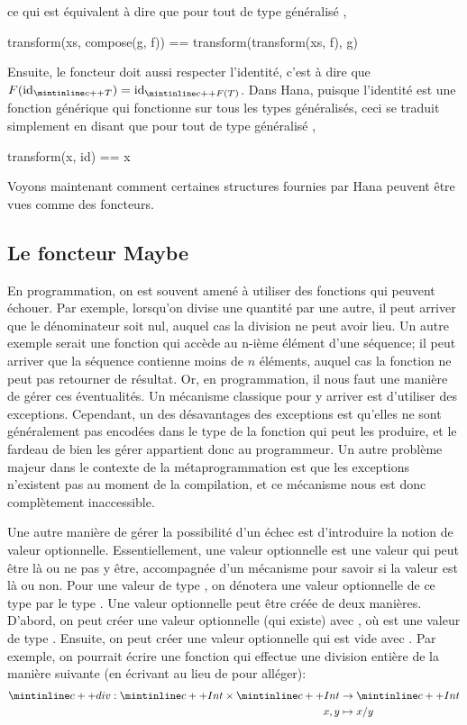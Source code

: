 ce qui est équivalent à dire que pour tout  de type généralisé ,
\begin{cpp}
    transform(xs, compose(g, f)) == transform(transform(xs, f), g)
\end{cpp}

Ensuite, le foncteur doit aussi respecter l'identité, c'est à dire que
$F(\id_{\cc{T}}) = \id_{\cc{F(T)}}$. Dans Hana, puisque l'identité est une
fonction générique qui fonctionne sur tous les types généralisés, ceci se
traduit simplement en disant que pour tout  de type généralisé ,
\begin{cpp}
    transform(x, id) == x
\end{cpp}

Voyons maintenant comment certaines structures fournies par Hana peuvent
être vues comme des foncteurs.


\subsection{Le foncteur Maybe}
En programmation, on est souvent amené à utiliser des fonctions qui peuvent
échouer. Par exemple, lorsqu'on divise une quantité par une autre, il peut
arriver que le dénominateur soit nul, auquel cas la division ne peut avoir
lieu. Un autre exemple serait une fonction qui accède au n-ième élément
d'une séquence; il peut arriver que la séquence contienne moins de $n$
éléments, auquel cas la fonction ne peut pas retourner de résultat. Or,
en programmation, il nous faut une manière de gérer ces éventualités. Un
mécanisme classique pour y arriver est d'utiliser des exceptions. Cependant,
un des désavantages des exceptions est qu'elles ne sont généralement pas
encodées dans le type de la fonction qui peut les produire, et le fardeau
de bien les gérer appartient donc au programmeur. Un autre problème majeur
dans le contexte de la métaprogrammation est que les exceptions n'existent
pas au moment de la compilation, et ce mécanisme nous est donc complètement
inaccessible.

Une autre manière de gérer la possibilité d'un échec est d'introduire la
notion de valeur optionnelle. Essentiellement, une valeur optionnelle est
une valeur qui peut être là ou ne pas y être, accompagnée d'un mécanisme
pour savoir si la valeur est là ou non. Pour une valeur de type ,
on dénotera une valeur optionnelle de ce type par le type .
Une valeur optionnelle peut être créée de deux manières. D'abord, on peut
créer une valeur optionnelle (qui existe) avec , où 
est une valeur de type . Ensuite, on peut créer une valeur optionnelle
qui est vide avec . Par exemple, on pourrait écrire une fonction
qui effectue une division entière de la manière suivante (en écrivant 
au lieu de  pour alléger):
\begin{align*}
    \cc{div} : \cc{Int} \times \cc{Int} &\to \cc{Int} \\
                                   x, y &\mapsto x / y
\end{align*}

